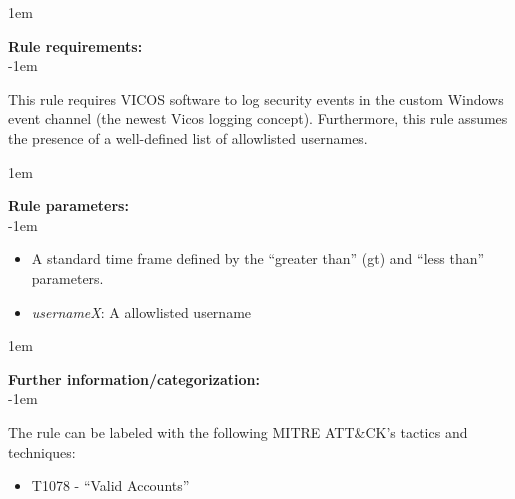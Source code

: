 \openup 1em

{\bf Rule requirements:} \\

\openup -1em
\vspace{-2em}

This rule requires VICOS software to log security events in the custom Windows event channel (the newest Vicos logging concept). Furthermore, this rule assumes the presence of a well-defined list of allowlisted usernames.

\openup 1em

{\bf Rule parameters:} \\

\openup -1em
\vspace{-2em}

\begin{itemize}
	\item A standard time frame defined by the ``greater than'' (gt) and ``less than'' parameters.
	\item \emph{usernameX}: A allowlisted username
\end{itemize}

\openup 1em

{\bf Further information/categorization:} \\

\openup -1em
\vspace{-2em}


The rule can be labeled with the following MITRE ATT\&CK's tactics and techniques:
\begin{itemize}
	\item T1078 - ``Valid Accounts''
\end{itemize}

\pagebreak

